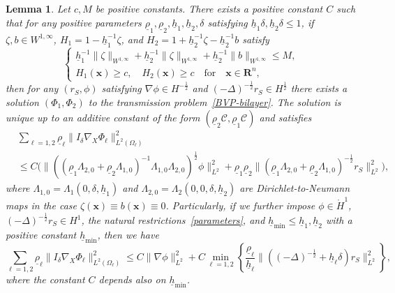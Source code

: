 \documentclass[11pt,leqno]{article}
\newtheorem{lemma}[theorem]{\bf Lemma}
\numberwithin{equation}{section}
\numberwithin{figure}{section}
\begin{document}
\begin{lemma}\label{L.elliptic.bilayer}
Let $c,M$ be positive constants. 
There exists a positive constant $C$ such that
for any positive parameters 
$\underline{\rho}_1, \underline{\rho}_2, \underline{h}_1, \underline{h}_2, \delta$ satisfying 
$\underline{h}_1\delta, \underline{h}_2\delta \leq 1$, 
if $\zeta,b \in W^{1,\infty}$, $H_1 = 1 - \underline{h}_1^{-1}\zeta$, and 
$H_2 = 1 + \underline{h}_2^{-1}\zeta - \underline{h}_2^{-1}b$ satisfy  
%
\[
\begin{cases}
 \underline{h}_1^{-1}\|\zeta\|_{W^{1,\infty}} + \underline{h}_2^{-1}\|\zeta\|_{W^{1,\infty}}
  + \underline{h}_2^{-1}\|b\|_{W^{1,\infty}} \leq M, \\
 H_1(\bm{x}) \geq c, \quad H_2(\bm{x}) \geq c \quad\mbox{for}\quad \bm{x}\in\mathbf{R}^n,
\end{cases}
\]
%
then for any $(r_S,\phi)$ satisfying $\nabla\phi\in H^{-\frac12}$ and $(-\Delta)^{-\frac12}r_S\in H^\frac12$ 
there exists a solution $(\Phi_1,\Phi_2)$ to the transmission problem~\eqref{BVP-bilayer}. 
The solution is unique up to an additive constant of the form $(\underline{\rho}_2\mathcal{C},\underline{\rho}_1\mathcal{C})$ 
and satisfies 
%
\begin{align}\label{EEforTMP1}
&\sum_{\ell=1,2}\underline{\rho}_\ell \|I_\delta\nabla_X\Phi_\ell\|_{L^2(\Omega_\ell)}^2 \\
&\leq C\bigl( 
 \|((\underline{\rho}_1\Lambda_{2,0}+\underline{\rho}_2\Lambda_{1,0})^{-1}\Lambda_{1,0}\Lambda_{2,0})^\frac12\phi\|_{L^2}^2 
 + \underline{\rho}_1\underline{\rho}_2\|(\underline{\rho}_1\Lambda_{2,0}+\underline{\rho}_2\Lambda_{1,0})^{-\frac12}r_S\|_{L^2}^2 \bigr),
 \nonumber
\end{align}
%
where $\Lambda_{1,0}=\Lambda_1(0,\delta,\underline{h}_1)$ and $\Lambda_{2,0}=\Lambda_2(0,0,\delta,\underline{h}_2)$ 
are Dirichlet-to-Neumann maps in the case $\zeta(\bm{x})\equiv b(\bm{x}) \equiv0$. 
Particularly, if we further impose $\phi\in\mathring{H}^1$, $(-\Delta)^{-\frac12}r_S\in H^1$, the natural restrictions~\eqref{parameters}, 
and  $\underline{h}_\mathrm{min} \leq \underline{h}_1,\underline{h}_2$ with a positive constant $\underline{h}_\mathrm{min}$, 
then we have 
%
\begin{equation}\label{EEforTMP2}
\sum_{\ell=1,2}\underline{\rho}_\ell \|I_\delta\nabla_X\Phi_\ell\|_{L^2(\Omega_\ell)}^2 
\leq C\|\nabla\phi\|_{L^2}^2 + C\min_{\ell=1,2}\left\{
 \frac{\underline{\rho}_\ell}{\underline{h}_\ell}\|((-\Delta)^{-\frac12} + \underline{h}_\ell\delta)r_S\|_{L^2}^2\right\},
\end{equation}
%
where the constant $C$ depends also on $\underline{h}_\mathrm{min}$. 
\end{lemma}
\end{document}
